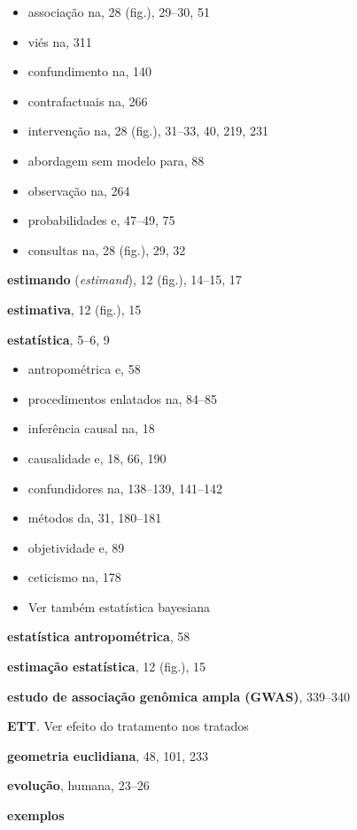 \documentclass[11pt,a5paper,twoside]{book}
\begin{document}
\begin{itemize}
\item associação na, 28 (fig.), 29–30, 51
\item viés na, 311
\item confundimento na, 140
\item contrafactuais na, 266
\item intervenção na, 28 (fig.), 31–33, 40, 219, 231
\item abordagem sem modelo para, 88
\item observação na, 264
\item probabilidades e, 47–49, 75
\item consultas na, 28 (fig.), 29, 32
\end{itemize}
\textbf{estimando} (\textit{estimand}), 12 (fig.), 14–15, 17

\textbf{estimativa}, 12 (fig.), 15

\textbf{estatística}, 5–6, 9

\begin{itemize}
\item antropométrica e, 58
\item procedimentos enlatados na, 84–85
\item inferência causal na, 18
\item causalidade e, 18, 66, 190
\item confundidores na, 138–139, 141–142
\item métodos da, 31, 180–181
\item objetividade e, 89
\item ceticismo na, 178
\item Ver também estatística bayesiana
\end{itemize}
\textbf{estatística antropométrica}, 58

\textbf{estimação estatística}, 12 (fig.), 15

\textbf{estudo de associação genômica ampla (GWAS)}, 339–340

\textbf{ETT}. Ver efeito do tratamento nos tratados

\textbf{geometria euclidiana}, 48, 101, 233

\textbf{evolução}, humana, 23–26

\textbf{exemplos}
\end{document}
